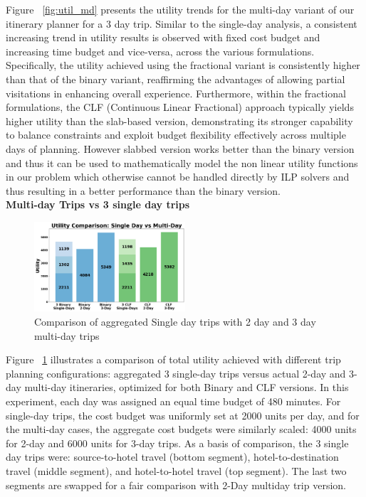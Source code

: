 Figure ~\ref{fig:util_md} presents the utility trends for the multi-day variant of our itinerary planner for a 3 day trip. Similar to the single-day analysis, a consistent increasing trend in utility results is observed with fixed cost budget and increasing time budget and vice-versa, across the various formulations. Specifically, the utility achieved using the fractional variant is consistently higher than that of the binary variant, reaffirming the advantages of allowing partial visitations in enhancing overall experience. Furthermore, within the fractional formulations, the CLF (Continuous Linear Fractional) approach typically yields higher utility than the slab-based version, demonstrating its stronger capability to balance constraints and exploit budget flexibility effectively across multiple days of planning. However slabbed version works better than the binary version and thus it can be used to mathematically model the non linear utility functions in our problem which otherwise cannot be handled directly by ILP solvers and thus resulting in a better performance than the binary version.\\

\noindent\textbf{Multi-day Trips vs 3 single day trips}
\begin{figure}[H]
\centering
\includegraphics[width=0.5\textwidth]{plots/multivssingle.png}
\caption{Comparison of aggregated Single day trips with 2 day and 3 day multi-day trips}
\label{fig:singlevsmultiday}
\end{figure}
Figure ~\ref{fig:singlevsmultiday}  illustrates a comparison of total utility achieved with different trip planning configurations: aggregated 3 single-day trips versus actual 2-day and 3-day multi-day itineraries, optimized for both Binary and CLF versions. In this experiment, each day was assigned an equal time budget of 480 minutes. For single-day trips, the cost budget was uniformly set at 2000 units per day, and for the multi-day cases, the aggregate cost budgets were similarly scaled: 4000 units for 2-day and 6000 units for 3-day trips. As a basis of comparison, the 3 single day trips were: source-to-hotel travel (bottom segment), hotel-to-destination travel (middle segment), and hotel-to-hotel travel (top segment). The last two segments are swapped for a fair comparison with 2-Day multiday trip version.\\

